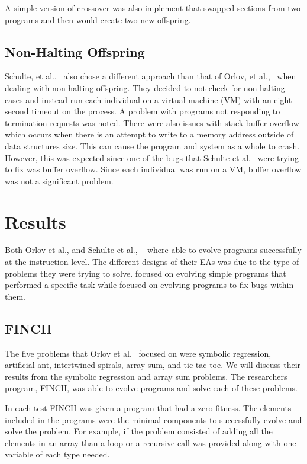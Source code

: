 \documentclass{sig-alternate}
\begin{document}
A simple version of crossover was also implement that swapped sections from two programs and then would create two new offspring. 

\subsection{Non-Halting Offspring}

Schulte, et al.,~\cite{Assembly:2010} also chose a different approach than that of Orlov, et al.,~\cite{FINCH:2011} when dealing with non-halting offspring. They decided to not check for non-halting cases and instead run each individual on a virtual machine (VM) with an eight second timeout on the process. A problem with programs not responding to termination requests was noted. There were also issues with stack buffer overflow which occurs when there is an attempt to write to a memory address outside of data structures size. This can cause the program and system as a whole to crash. However, this was expected since one of the bugs that Schulte et al.~\cite{Assembly:2010} were trying to fix was buffer overflow. Since each individual was run on a VM, buffer overflow was not a significant problem.




\section{Results}
Both Orlov et al., and Schulte et al., ~\cite{FINCH:2011, Assembly:2010} where able to evolve programs successfully at the instruction-level. The different designs of their EAs was due to the type of problems they were trying to solve. \cite{FINCH:2011} focused on evolving simple programs that performed a specific task while \cite{Assembly:2010} focused on evolving programs to fix bugs within them.

\subsection{FINCH}
The five problems that Orlov et al.~\cite{Assembly:2010} focused on were symbolic regression, artificial ant, intertwined spirals, array sum, and tic-tac-toe. We will discuss their results from the symbolic regression and array sum problems. The researchers program, FINCH, was able to evolve programs and solve each of these problems.

In each test FINCH was given a program that had a zero fitness. The elements included in the programs were the minimal components to successfully evolve and solve the problem. For example, if the problem consisted of adding all the elements in an array than a loop or a recursive call was provided along with one variable of each type needed.
\end{document}
